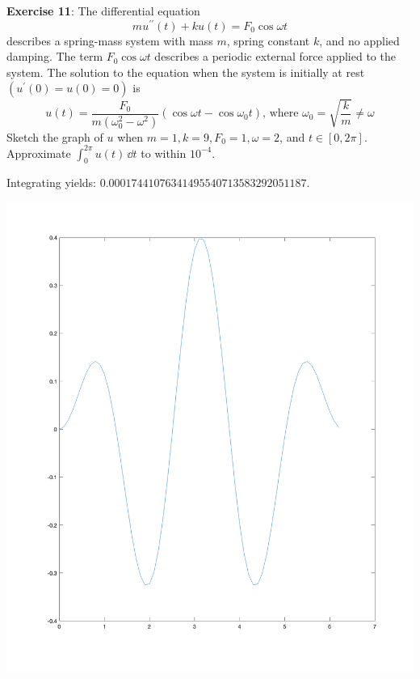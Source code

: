 \documentclass{article}
\begin{document}
\begin{answer}
\begin{center}
        \end{center}
    \end{answer}

\textbf{Exercise 11}: The differential equation 
    \begin{equation*}
        mu^{\prime\prime}(t) + ku(t) = F_{0} \cos{\omega t}
    \end{equation*}
describes a spring-mass system with mass $m$, spring constant $k$, and no applied damping. The term $F_{0} \cos{\omega t}$ describes a periodic external force applied to the system. The solution to the equation when the system is initially at rest $(u^{\prime}(0) = u(0) = 0)$ is
    \begin{equation*}
        u(t) = \dfrac{F_{0}}{m(\omega_{0}^{2} - \omega^{2})}(\cos{\omega t - \cos{\omega_{0}t}}), \, \text{where } \omega_{0} = \sqrt{\dfrac{k}{m}} \neq \omega
    \end{equation*}
Sketch the graph of $u$ when $m = 1, k = 9, F_{0} = 1, \omega = 2$, and $t \in [0, 2\pi]$. Approximate $\int_{0}^{2\pi} u(t) \, \dd{t}$ to within $10^{-4}$.
    \begin{answer}
        Integrating yields: $0.00017441076341495540713583292051187$.
        \begin{center}
            \includegraphics[scale=0.2]{spring_mass}
        \end{center}
    \end{answer}
\end{document}
